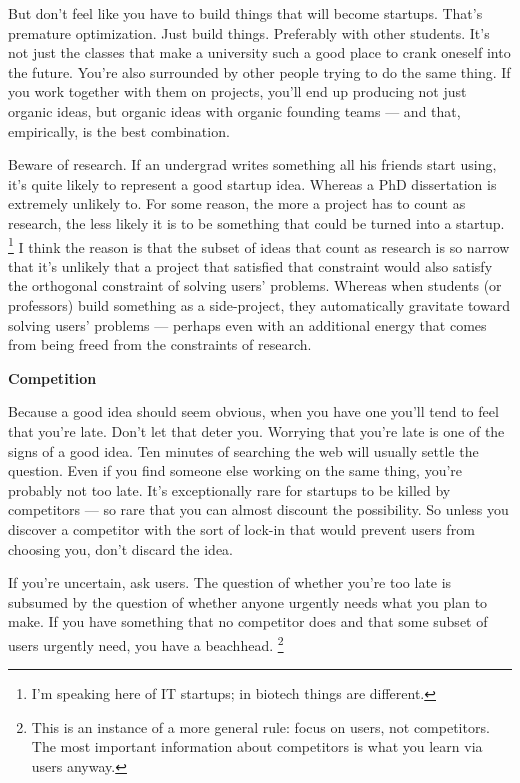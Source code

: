 But don't feel like you have to build things that will become startups.
That's premature optimization. Just build things. Preferably with other
students. It's not just the classes that make a university such a good
place to crank oneself into the future. You're also surrounded by other
people trying to do the same thing. If you work together with them on
projects, you'll end up producing not just organic ideas, but organic
ideas with organic founding teams --- and that, empirically, is the best
combination.

Beware of research. If an undergrad writes something all his friends
start using, it's quite likely to represent a good startup idea. Whereas
a PhD dissertation is extremely unlikely to. For some reason, the more a
project has to count as research, the less likely it is to be something
that could be turned into a startup. \footnote{I'm speaking here of IT startups; in biotech things are
different.} I think
the reason is that the subset of ideas that count as research is so
narrow that it's unlikely that a project that satisfied that constraint
would also satisfy the orthogonal constraint of solving users' problems.
Whereas when students (or professors) build something as a side-project,
they automatically gravitate toward solving users' problems --- perhaps
even with an additional energy that comes from being freed from the
constraints of research.

\textbf{Competition}

Because a good idea should seem obvious, when you have one you'll tend
to feel that you're late. Don't let that deter you. Worrying that you're
late is one of the signs of a good idea. Ten minutes of searching the
web will usually settle the question. Even if you find someone else
working on the same thing, you're probably not too late. It's
exceptionally rare for startups to be killed by competitors --- so rare
that you can almost discount the possibility. So unless you discover a
competitor with the sort of lock-in that would prevent users from
choosing you, don't discard the idea.

If you're uncertain, ask users. The question of whether you're too late
is subsumed by the question of whether anyone urgently needs what you
plan to make. If you have something that no competitor does and that
some subset of users urgently need, you have a beachhead.
\footnote{This is an instance of a more general rule: focus on users, not
competitors. The most important information about competitors is what
you learn via users anyway.}

